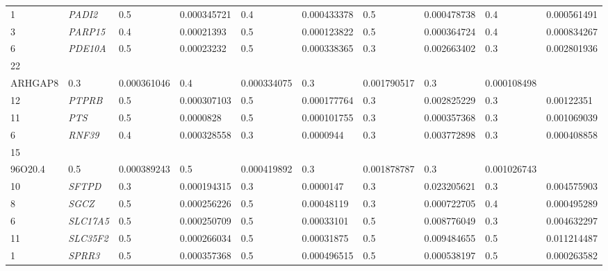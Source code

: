 \begin{refsection}
\begin{otherlanguage}{english}
\begin{scriptsize}
\begin{longtable}{llllllllll}
1 & \cellcolor[HTML]{CBCEFB}\textit{PADI2} & 0.5 & 0.000345721 & 0.4 & 0.000433378 & 0.5 & \cellcolor[HTML]{CBCEFB}0.000478738 & 0.4 & 0.000561491 \\
3 & \cellcolor[HTML]{CBCEFB}\textit{PARP15} & 0.4 & 0.00021393 & 0.5 & 0.000123822 & 0.5 & \cellcolor[HTML]{CBCEFB}0.000364724 & 0.4 & 0.000834267 \\
6 & \cellcolor[HTML]{CBCEFB}\textit{PDE10A} & 0.5 & 0.00023232 & 0.5 & 0.000338365 & 0.3 & 0.002663402 & 0.3 & 0.002801936 \\
22 & \cellcolor[HTML]{CBCEFB}\textit{\begin{tabular}[c]{@{}c@{}}PRR5-\\ ARHGAP8\end{tabular}} & 0.3 & 0.000361046 & 0.4 & 0.000334075 & 0.3 & 0.001790517 & 0.3 & \cellcolor[HTML]{CBCEFB}0.000108498 \\
12 & \cellcolor[HTML]{CBCEFB}\textit{PTPRB} & 0.5 & 0.000307103 & 0.5 & 0.000177764 & 0.3 & 0.002825229 & 0.3 & 0.00122351 \\
11 & \cellcolor[HTML]{CBCEFB}\textit{PTS} & 0.5 & 0.0000828 & 0.5 & 0.000101755 & 0.3 & \cellcolor[HTML]{CBCEFB}0.000357368 & 0.3 & 0.001069039 \\
6 & \cellcolor[HTML]{CBCEFB}\textit{RNF39} & 0.4 & 0.000328558 & 0.3 & 0.0000944 & 0.3 & 0.003772898 & 0.3 & \cellcolor[HTML]{CBCEFB}0.000408858 \\
15 & \cellcolor[HTML]{CBCEFB}\textit{\begin{tabular}[c]{@{}c@{}}RP11-\\ 96O20.4\end{tabular}} & 0.5 & 0.000389243 & 0.5 & 0.000419892 & 0.3 & 0.001878787 & 0.3 & 0.001026743 \\
10 & \cellcolor[HTML]{CBCEFB}\textit{SFTPD} & 0.3 & 0.000194315 & 0.3 & 0.0000147 & 0.3 & 0.023205621 & 0.3 & 0.004575903 \\
8 & \cellcolor[HTML]{CBCEFB}\textit{SGCZ} & 0.5 & 0.000256226 & 0.5 & 0.00048119 & 0.3 & 0.000722705 & 0.4 & \cellcolor[HTML]{CBCEFB}0.000495289 \\
6 & \cellcolor[HTML]{CBCEFB}\textit{SLC17A5} & 0.5 & 0.000250709 & 0.5 & 0.00033101 & 0.5 & 0.008776049 & 0.3 & 0.004632297 \\
11 & \cellcolor[HTML]{CBCEFB}\textit{SLC35F2} & 0.5 & 0.000266034 & 0.5 & 0.00031875 & 0.5 & 0.009484655 & 0.5 & 0.011214487 \\
1 & \cellcolor[HTML]{CBCEFB}\textit{SPRR3} & 0.5 & 0.000357368 & 0.5 & 0.000496515 & 0.5 & 0.000538197 & 0.5 & \cellcolor[HTML]{CBCEFB}0.000263582 \\

\end{longtable}
\end{scriptsize}
\end{otherlanguage}
\end{refsection}
